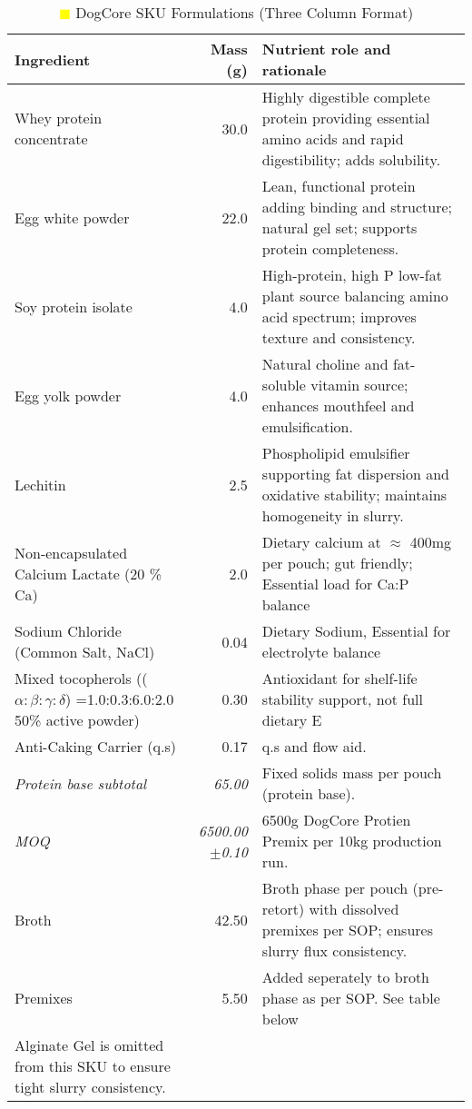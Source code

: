 \begin{table}[h]
\centering
\begin{tabular}{@{}l r p{8.0cm}@{}}
\toprule
\textbf{Ingredient} & \textbf{Mass (g)} & \textbf{Nutrient role and rationale} \\
\midrule
Whey protein concentrate & 30.0 & Highly digestible complete protein providing essential amino acids and rapid digestibility; adds solubility. \\[3pt]
Egg white powder & 22.0 & Lean, functional protein adding binding and structure; natural gel set; supports protein completeness. \\[3pt]
Soy protein isolate & 4.0 & High-protein, high P low-fat plant source balancing amino acid spectrum; improves texture and consistency. \\[3pt]
Egg yolk powder & 4.0 & Natural choline and fat-soluble vitamin source; enhances mouthfeel and emulsification. \\[3pt]
Lechitin & 2.5 & Phospholipid emulsifier supporting fat dispersion and oxidative stability; maintains homogeneity in slurry. \\[3pt]
Non-encapsulated Calcium Lactate (20 \% Ca) & 2.0 & Dietary calcium at $\approx$ 400mg per pouch; gut friendly; Essential load for Ca:P balance \\[3pt]
Sodium Chloride (Common Salt, NaCl) & 0.04 & Dietary Sodium, Essential for electrolyte balance \\[3pt]
\midrule
Mixed tocopherols (($\alpha:\beta:\gamma:\delta$) =1.0:0.3:6.0:2.0 50\% active powder) & 0.30  & Antioxidant for shelf-life stability support, not full dietary E \\[2pt]
Anti-Caking Carrier (q.s) & 0.17 & q.s and flow aid. \\[3pt]
\midrule
\textit{Protein base subtotal} & \textit{65.00} & Fixed solids mass per pouch (protein base). \\[3pt]
\textit {MOQ} &\textit{6500.00 $\pm$0.10} & 6500g DogCore Protien Premix per 10kg production run. \\[3pt]
Broth & 42.50 & Broth phase per pouch (pre-retort) with dissolved premixes per SOP; ensures slurry flux consistency. \\[3pt]
Premixes & 5.50 & Added seperately to broth phase as per SOP. See table below \\[3pt]
Alginate Gel is omitted from this SKU to ensure tight slurry consistency. \\[3pt]
\bottomrule
\end{tabular}
\caption{\textcolor{yellow}{$\blacksquare$} DogCore SKU Formulations (Three Column Format)}
\label{tab:dogcore_sku_3col}
\end{table}

